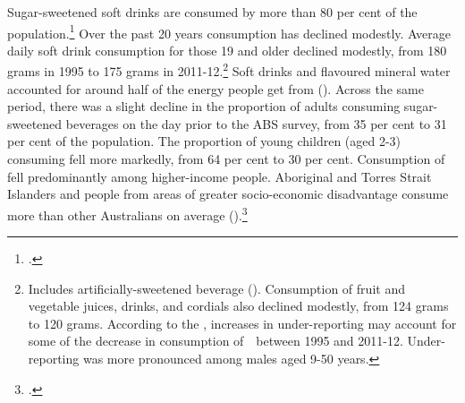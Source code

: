 \documentclass[embargoed]{grattan}
\begin{document}
Sugar-sweetened soft drinks are consumed by more than 80 per cent of the population.\footcite{Levy2014QuenchingAustraliasthirst} %
\CenturyFootnote  %
Over the past 20 years consumption has declined modestly. Average daily soft drink consumption for those 19 and older declined modestly, from 180 grams in 1995 to 175 grams in 2011-12.\footnote{Includes artificially-sweetened beverage (\textcites[][Table~5.1]{ABS20144364055007AustralianHealth}[][Table~1]{ABS199948040NationalNutrition}). Consumption of fruit and vegetable juices, drinks, and cordials also declined modestly, from 124 grams to 120 grams. According to the \textcite{ABS20144364055007AustralianHealth}, increases in under-reporting may account for some of the decrease in consumption of~\SSBs{}~between 1995 and 2011-12. Under-reporting was more pronounced among males aged 9-50 years.} %
Soft drinks and flavoured mineral water accounted for around half of the energy people get from \SSBs{} ().
Across the same period, there was a slight decline in the proportion of adults consuming sugar-sweetened beverages on the day prior to the ABS survey, from 35 per cent to 31 per cent of the population.
The proportion of young children (aged 2-3) consuming \SSBs{} fell more markedly, from 64 per cent to 30 per cent.
Consumption of \SSBs{} fell predominantly among higher-income people.
Aboriginal and Torres Strait Islanders and people from areas of greater socio-economic disadvantage consume more \SSBs{} than other Australians on average ().\footcites{ABS20144364055007AustralianHealth}{ABS199948040NationalNutrition}
\end{document}

